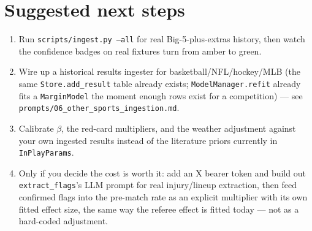 \documentclass[11pt]{article}
\begin{document}
\section{Suggested next steps}
\label{sec:roadmap}
\begin{enumerate}
\item Run \texttt{scripts/ingest.py --all} for real Big-5-plus-extras history, then watch the
confidence badges on real fixtures turn from amber to green.
\item Wire up a historical results ingester for basketball/NFL/hockey/MLB (the same
\texttt{Store.add\_result} table already exists; \texttt{ModelManager.refit} already fits a
\texttt{MarginModel} the moment enough rows exist for a competition) --- see
\texttt{prompts/06\_other\_sports\_ingestion.md}.
\item Calibrate $\beta$, the red-card multipliers, and the weather adjustment against your own
ingested results instead of the literature priors currently in \texttt{InPlayParams}.
\item Only if you decide the cost is worth it: add an X bearer token and build out
\texttt{extract\_flags}'s LLM prompt for real injury/lineup extraction, then feed confirmed flags
into the pre-match rate as an explicit multiplier with its own fitted effect size, the same way
the referee effect is fitted today --- not as a hard-coded adjustment.
\end{enumerate}
\end{document}
